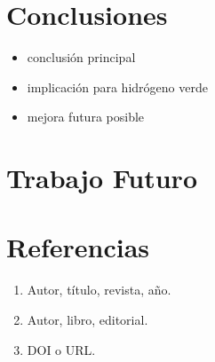 \documentclass[11pt,a4paper]{article}
\begin{document}
\section{Conclusiones}


\begin{itemize}

\item conclusión principal

\item implicación para hidrógeno verde

\item mejora futura posible

\end{itemize}

\section{Trabajo Futuro}


\section{Referencias}


\begin{enumerate}

\item Autor, título, revista, año.

\item Autor, libro, editorial.

\item DOI o URL.

\end{enumerate}
\end{document}
